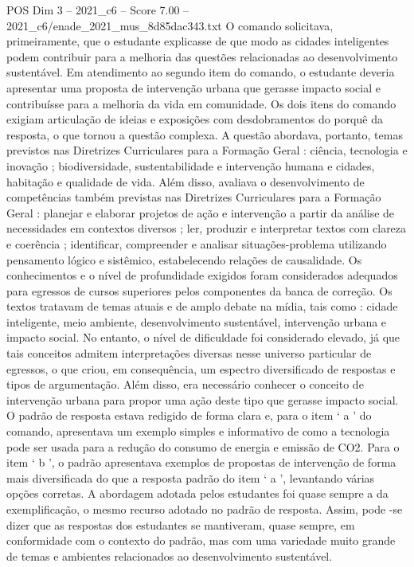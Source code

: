 \begin{textsample}{POS Dim 3 – 2021\_c6 – Score 7.00 – 2021\_c6/enade\_2021\_mus\_8d85dac343.txt}
O comando solicitava, primeiramente, que o estudante explicasse de que modo as cidades inteligentes podem contribuir para a melhoria das questões relacionadas ao desenvolvimento sustentável.
Em atendimento ao segundo item do comando, o estudante deveria apresentar uma proposta de intervenção urbana que gerasse impacto social e contribuísse para a melhoria da vida em comunidade.
Os dois itens do comando exigiam articulação de ideias e exposições com desdobramentos do porquê da resposta, o que tornou a questão complexa.
A questão abordava, portanto, temas previstos nas Diretrizes Curriculares para a Formação Geral : ciência, tecnologia e inovação ; biodiversidade, sustentabilidade e intervenção humana e cidades, habitação e qualidade de vida.
Além disso, avaliava o desenvolvimento de competências também previstas nas Diretrizes Curriculares para a Formação Geral : planejar e elaborar projetos de ação e intervenção a partir da análise de necessidades em contextos diversos ; ler, produzir e interpretar textos com clareza e coerência ; identificar, compreender e analisar situações-problema utilizando pensamento lógico e sistêmico, estabelecendo relações de causalidade.
Os conhecimentos e o nível de profundidade exigidos foram considerados adequados para egressos de cursos superiores pelos componentes da banca de correção.
Os textos tratavam de temas atuais e de amplo debate na mídia, tais como : cidade inteligente, meio ambiente, desenvolvimento sustentável, intervenção urbana e impacto social.
No entanto, o nível de dificuldade foi considerado elevado, já que tais conceitos admitem interpretações diversas nesse universo particular de egressos, o que criou, em consequência, um espectro diversificado de respostas e tipos de argumentação.
Além disso, era necessário conhecer o conceito de intervenção urbana para propor uma ação deste tipo que gerasse impacto social.
O padrão de resposta estava redigido de forma clara e, para o item ‘ a ’ do comando, apresentava um exemplo simples e informativo de como a tecnologia pode ser usada para a redução do consumo de energia e emissão de CO2.
Para o item ‘ b ’, o padrão apresentava exemplos de propostas de intervenção de forma mais diversificada do que a resposta padrão do item ‘ a ’, levantando várias opções corretas.
A abordagem adotada pelos estudantes foi quase sempre a da exemplificação, o mesmo recurso adotado no padrão de resposta.
Assim, pode -se dizer que as respostas dos estudantes se mantiveram, quase sempre, em conformidade com o contexto do padrão, mas com uma variedade muito grande de temas e ambientes relacionados ao desenvolvimento sustentável.

\end{textsample}
